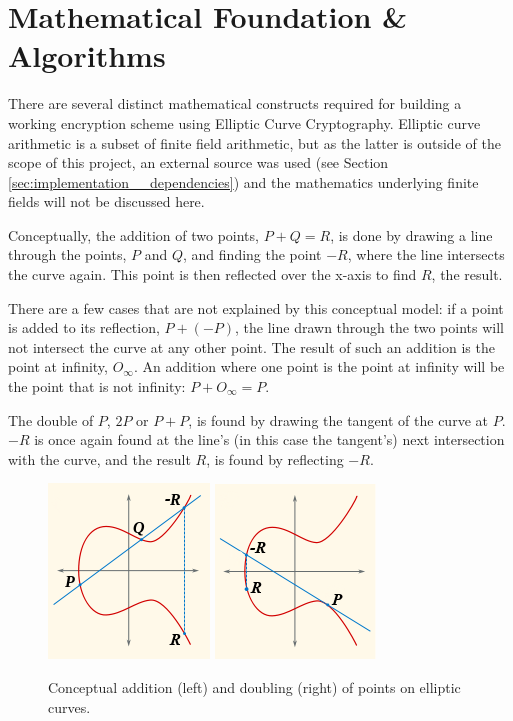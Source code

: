 \section{Mathematical Foundation \& Algorithms}

There are several distinct mathematical constructs required for building a working encryption scheme using Elliptic
Curve Cryptography. Elliptic curve arithmetic is a subset of finite field arithmetic, but as the latter is outside
of the scope of this project, an external source was used (see Section \ref{sec:implementation__dependencies}) and
the mathematics underlying finite fields will not be discussed here.

Conceptually, the addition of two points, \(P + Q = R\), is done by drawing a line through the points, \(P\) and \(Q\),
and finding the point \(-R\), where the line intersects the curve again. This point is
then reflected over the x-axis to find \(R\), the result.

There are a few cases that are not explained by this conceptual model: if a point is added to its reflection, \(P + (-P)\),
the line drawn through the two points will not intersect the curve at any other point. The result of such an addition is
the point at infinity, \(O_\infty\). An addition where one point is the point at infinity will be the point that is not
infinity: \(P + O_\infty = P\).

The double of \(P\), \(2P\) or \(P+P\), is found by drawing the tangent of the curve at \(P\).
\(-R\) is once again found at the line's (in this case the tangent's) next intersection
with the curve, and the result \(R\), is found by reflecting \(-R\).\cite{hankerson2010}

\begin{figure}[htb]
	\centering
	\includegraphics{maths/addition}
	\includegraphics{maths/doubling}
	\caption{Conceptual addition (left) and doubling (right) of points on elliptic curves.}
\end{figure}


